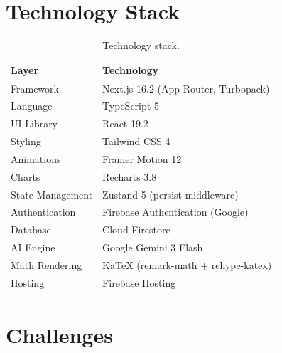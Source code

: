 \documentclass[12pt, a4paper]{article}
\begin{document}
\section{Technology Stack}
\label{sec:tech}

\begin{table}[H]
\centering
\begin{tabular}{l l}
\toprule
\textbf{Layer} & \textbf{Technology} \\
\midrule
Framework & Next.js 16.2 (App Router, Turbopack) \\
Language & TypeScript 5 \\
UI Library & React 19.2 \\
Styling & Tailwind CSS 4 \\
Animations & Framer Motion 12 \\
Charts & Recharts 3.8 \\
State Management & Zustand 5 (persist middleware) \\
Authentication & Firebase Authentication (Google) \\
Database & Cloud Firestore \\
AI Engine & Google Gemini 3 Flash \\
Math Rendering & KaTeX (remark-math + rehype-katex) \\
Hosting & Firebase Hosting \\
\bottomrule
\end{tabular}
\caption{Technology stack.}
\label{tab:tech}
\end{table}

\section{Challenges}
\label{sec:challenges}
\end{document}
